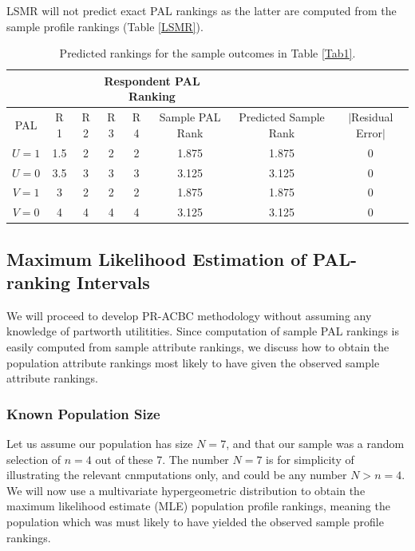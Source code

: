 \documentclass[a4paper, 12pt]{article}
\begin{document}
 LSMR will not predict exact PAL rankings as the latter   are computed from the sample profile rankings (Table \ref{LSMR}).
 
 \begin{table}[!htpb]
 	\centering
 	\scriptsize
 	\begin{tabular}{c|cccc|c|c|c}
 		\multicolumn{2}{c}{} &\multicolumn{4}{c}{Respondent PAL Ranking}\\\hline
 		PAL & R 1&  R 2& R 3& R 4 &Sample PAL Rank&Predicted Sample Rank& $\mid$Residual Error$|$\\  \hline
 		$U=1$ &1.5&2&2&2&1.875&1.875&0\\
 		$U=0$&3.5&3&3&3&3.125&3.125&0 \\
 		$V=1$&3&2&2&2&1.875 &1.875&0 \\
 		$V=0$&4&4&4&4&3.125 &3.125&0\\\hline
 	\end{tabular}
 	\caption{{\small Predicted rankings for the sample outcomes in Table \ref{Tab1}.}}
 	\label{LSMR2}
 \end{table}

\subsection{Maximum Likelihood Estimation of PAL-ranking Intervals}
We will proceed to develop PR-ACBC methodology without assuming any knowledge of partworth utilitities.  Since computation of sample PAL rankings is easily computed from sample attribute rankings, we discuss how to obtain the population attribute rankings most likely to have given the observed sample attribute rankings.
\subsubsection{Known Population Size}
Let us assume our population has size $N=7$, and that our sample was a random selection of $n=4$ out of these 7. The number $N=7$ is for simplicity of illustrating the relevant cnmputations only, and could be any number $N>n=4$.  We will now use a multivariate hypergeometric distribution to obtain the maximum likelihood estimate (MLE) population profile rankings, meaning the population which was must likely to have yielded the observed sample profile rankings.  
\end{document}
